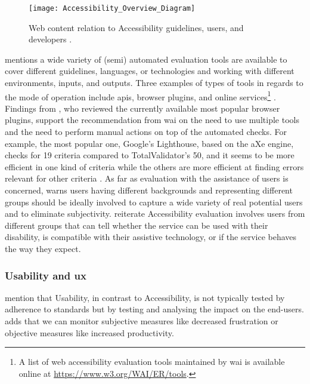 \begin{figure}[H]
    \centering
    \texttt{[image: Accessibility\_Overview\_Diagram]}
    \caption{Web content relation to Accessibility guidelines, users, and developers \parencite{WAI_WCAG}.}
    \label{fig:wcag-context}
\end{figure}

\label{Accessibility-Tools}

\textcite{WAI_Evaluation_Tools} mentions a wide variety of (semi) automated evaluation tools are available to cover different guidelines, languages, or technologies and working with different environments, inputs, and outputs.
Three examples of types of tools in regards to the mode of operation include \glspl{api}, browser plugins, and online services\footnote{A list of web accessibility evaluation tools maintained by \gls{wai} is available online at \url{https://www.w3.org/WAI/ER/tools}.} \parencite{WAI_Evaluation_Tools}.
Findings from \textcite{Frazão_Duarte_2020}, who reviewed the currently available most popular browser plugins, support the recommendation from \gls{wai} on the need to use multiple tools and the need to perform manual actions on top of the automated checks.
For example, the most popular one, Google's Lighthouse, based on the aXe engine, checks for 19 criteria compared to TotalValidator's 50, and it seems to be more efficient in one kind of criteria while the others are more efficient at finding errors relevant for other criteria \parencite{Frazão_Duarte_2020}.
As far as evaluation with the assistance of users is concerned, \textcite{WAI_Evaluation_Users} warns users having different backgrounds and representing different groups should be ideally involved to capture a wide variety of real potential users and to eliminate subjectivity.
\textcite{Wegge_Zimmermann_2007} reiterate Accessibility evaluation involves users from different groups that can tell whether the service can be used with their disability, is compatible with their assistive technology, or if the service behaves the way they expect.

\subsubsection{Usability and \gls{ux}}

\textcite{Wegge_Zimmermann_2007} mention that Usability, in contrast to Accessibility, is not typically tested by adherence to standards but by testing and analysing the impact on the end-users.
\textcite{Edyburn_2021} adds that we can monitor subjective measures like decreased frustration or objective measures like increased productivity.

